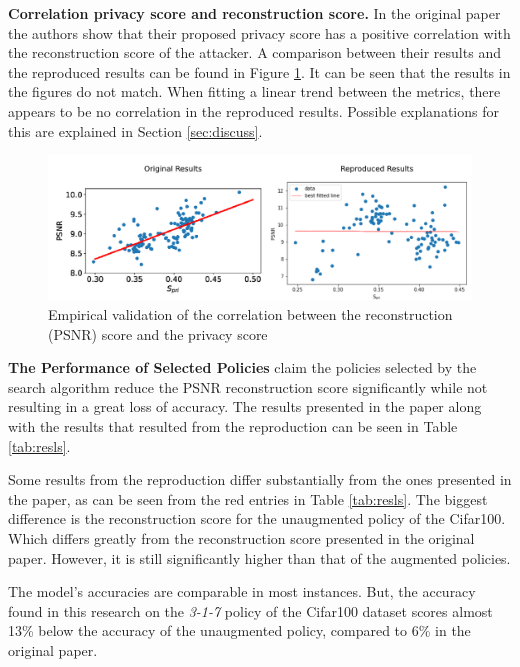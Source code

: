 \textbf{Correlation privacy score and reconstruction score.} In the original paper the authors show that their proposed privacy score has a positive correlation with the reconstruction score of the attacker. A comparison between their results and the reproduced results can be found in Figure \ref{fig:correlation}. It can be seen that the results in the figures do not match. When fitting a linear trend between the metrics, there appears to be no correlation in the reproduced results. Possible explanations for this are explained in Section \ref{sec:discuss}.

\begin{figure}[htp]
    \centering
    \includegraphics[width=12cm]{pics/correlation_comparison.png}
    \caption{Empirical validation of the correlation between the reconstruction (PSNR) score and the privacy score}
    \label{fig:correlation}
\end{figure}


\textbf{The Performance of Selected Policies} \citeauthor{gao2021privacy} claim the policies selected by the search algorithm reduce the PSNR reconstruction score significantly while not resulting in a great loss of accuracy. The results presented in the paper along with the results that resulted from the reproduction can be seen in Table \ref{tab:resls}.


Some results from the reproduction differ substantially from the ones presented in the paper, as can be seen from the red entries in Table \ref{tab:resls}. The biggest difference is the reconstruction score for the unaugmented policy of the Cifar100. Which differs greatly from the reconstruction score presented in the original paper. However, it is still significantly higher than that of the augmented policies.

The model's accuracies are comparable in most instances. But, the accuracy found in this research on the \textit{3-1-7} policy of the Cifar100 dataset scores almost 13\% below the accuracy of the unaugmented policy, compared to 6\% in the original paper.


